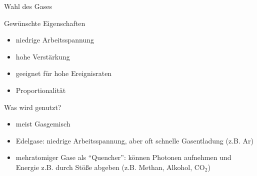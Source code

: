 \begin{frame}{Wahl des Gases}
	\begin{block}{Gewünschte Eigenschaften}
		\begin{itemize}
		  \item niedrige Arbeitsspannung
		  \item hohe Verstärkung
		  \item geeignet für hohe Ereignisraten
		  \item Proportionalität
		\end{itemize}
	\end{block}
	\begin{block}{Was wird genutzt?}
		\begin{itemize}
			\item meist Gasgemisch
			\item Edelgase: niedrige Arbeitsspannung, aber oft schnelle Gasentladung (z.B. Ar)
			\item mehratomiger Gase als "`Quencher"': können Photonen aufnehmen und Energie z.B. durch
			Stöße abgeben (z.B. Methan, Alkohol, CO$_2$)
		\end{itemize}
	\end{block}
\end{frame}
